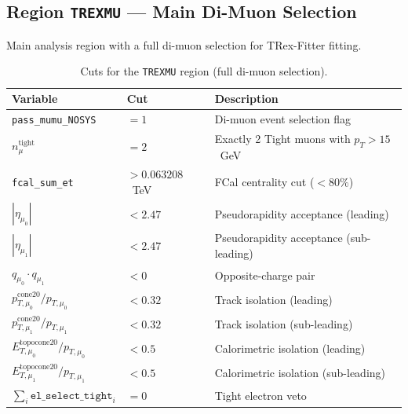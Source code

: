 \documentclass[12pt,a4paper]{article}
\begin{document}
\subsection{Region \texttt{TREXMU} --- Main Di-Muon Selection}

Main analysis region with a full di-muon selection for TRex-Fitter fitting.

\begin{table}[h!]
\centering
\caption{Cuts for the \texttt{TREXMU} region (full di-muon selection).}
\begin{tabular}{lll}
\toprule
\textbf{Variable} & \textbf{Cut} & \textbf{Description} \\
\midrule
\texttt{pass\_mumu\_NOSYS}                          & $= 1$              & Di-muon event selection flag \\
$n_\mu^{\text{tight}}$                              & $= 2$              & Exactly 2 Tight muons with $p_T > 15$~GeV \\
\texttt{fcal\_sum\_et}                              & $> 0.063208$~TeV   & FCal centrality cut ($< 80\%$) \\
$|\eta_{\mu_0}|$                                    & $< 2.47$           & Pseudorapidity acceptance (leading) \\
$|\eta_{\mu_1}|$                                    & $< 2.47$           & Pseudorapidity acceptance (sub-leading) \\
$q_{\mu_0} \cdot q_{\mu_1}$                         & $< 0$              & Opposite-charge pair \\
$p_{T,\mu_0}^{\text{cone20}} / p_{T,\mu_0}$        & $< 0.32$           & Track isolation (leading) \\
$p_{T,\mu_1}^{\text{cone20}} / p_{T,\mu_1}$        & $< 0.32$           & Track isolation (sub-leading) \\
$E_{T,\mu_0}^{\text{topocone20}} / p_{T,\mu_0}$    & $< 0.5$            & Calorimetric isolation (leading) \\
$E_{T,\mu_1}^{\text{topocone20}} / p_{T,\mu_1}$    & $< 0.5$            & Calorimetric isolation (sub-leading) \\
$\sum_i \texttt{el\_select\_tight}_i$               & $= 0$              & Tight electron veto \\
\bottomrule
\end{tabular}
\end{table}
\end{document}
